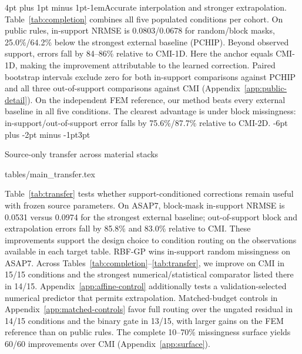 \documentclass{article}
\makeatletter
\renewcommand{\subsection}{\@startsection{subsection}{2}{\z@}
  {-6pt plus -2pt minus -1pt}{3pt}{\normalsize\sc\raggedright}}
\renewcommand{\paragraph}{\@startsection{paragraph}{4}{\z@}
  {4pt plus 1pt minus 1pt}{-1em}{\normalsize\bf}}
\newcommand{\tabdir}{tables}
\newcommand{\tableinput}[1]{\@@input \tabdir/#1 }
\makeatother
\begin{document}
\paragraph{Accurate interpolation and stronger extrapolation.}
Table~\ref{tab:completion} combines all five populated conditions per cohort.
On public rules, in-support NRMSE is 0.0803/0.0678 for random/block masks,
25.0\%/64.2\% below the strongest external baseline (PCHIP).
Beyond observed support, errors fall by 84--86\% relative to CMI-1D.
Here the anchor equals CMI-1D, making the improvement attributable to the
learned correction. Paired bootstrap intervals exclude zero for both in-support
comparisons against PCHIP and all three out-of-support comparisons against CMI
(Appendix~\ref{app:public-detail}).
On the independent FEM reference, our method beats every external baseline
in all five conditions. The clearest advantage is under block missingness:
in-support/out-of-support error falls by 75.6\%/87.7\% relative to CMI-2D.
\subsection{Source-only transfer across material stacks}
\label{sec:transfer}

\begin{table}
\vspace{-\baselineskip}
\centering
\small
\caption{\textbf{Source-only transfer to ASAP7, 30\% missingness.}
Mean-mask macro NRMSE ($\downarrow$); bold: best; underline: ours second-best.}
\label{tab:transfer}
\tableinput{main_transfer.tex}
\end{table}

Table~\ref{tab:transfer} tests whether support-conditioned corrections remain
useful with frozen source parameters. On ASAP7, block-mask in-support NRMSE is
0.0531 versus 0.0974 for the strongest external baseline; out-of-support block
and extrapolation errors fall by 85.8\% and 83.0\% relative to CMI.
These improvements support the design choice to condition routing on the
observations available in each target table.
RBF-GP wins in-support random missingness on ASAP7.
Across Tables~\ref{tab:completion}--\ref{tab:transfer}, we improve on CMI in
15/15 conditions and the strongest numerical/statistical comparator listed
there in 14/15. Appendix~\ref{app:affine-control} additionally tests a
validation-selected numerical predictor that permits extrapolation.
Matched-budget controls in Appendix~\ref{app:matched-controls} favor full
routing over the ungated residual in 14/15 conditions and the binary gate in
13/15, with larger gains on the FEM reference than on public rules.
The complete 10--70\% missingness surface yields 60/60 improvements over CMI
(Appendix~\ref{app:surface}).
\end{document}

